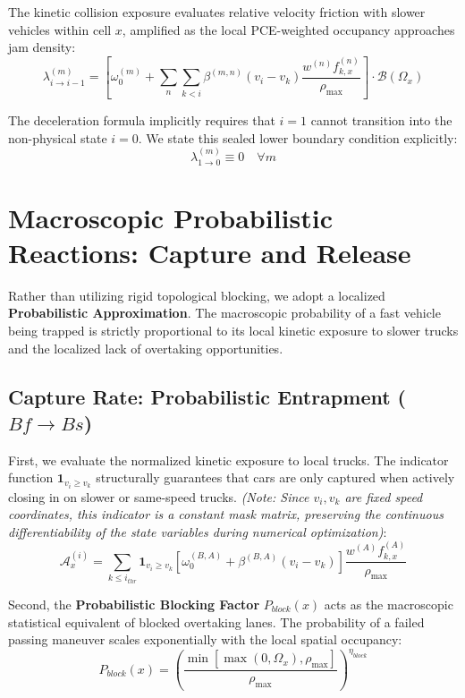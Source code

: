 \documentclass[11pt,a4paper]{article}
\begin{document}
The kinetic collision exposure evaluates relative velocity friction with slower vehicles within cell $x$, amplified as the local PCE-weighted occupancy approaches jam density:
\begin{equation}
\lambda_{i\rightarrow i-1}^{(m)} = \left[ \omega_{0}^{(m)} + \sum_{n}\sum_{k<i}\beta^{(m,n)}(v_{i}-v_{k}) \frac{w^{(n)} f_{k,x}^{(n)}}{\rho_{\max}} \right] \cdot \mathcal{B}(\Omega_{x})
\end{equation}

The deceleration formula implicitly requires that $i=1$ cannot transition into the non-physical state $i=0$. We state this sealed lower boundary condition explicitly:
\begin{equation}
\lambda_{1\rightarrow 0}^{(m)} \equiv 0 \quad \forall m
\end{equation}

\section{Macroscopic Probabilistic Reactions: Capture and Release}
Rather than utilizing rigid topological blocking, we adopt a localized \textbf{Probabilistic Approximation}. The macroscopic probability of a fast vehicle being trapped is strictly proportional to its local kinetic exposure to slower trucks and the localized lack of overtaking opportunities.

\subsection{Capture Rate: Probabilistic Entrapment ($Bf \rightarrow Bs$)}
First, we evaluate the normalized kinetic exposure to local trucks. The indicator function $\mathbf{1}_{v_i \ge v_k}$ structurally guarantees that cars are only captured when actively closing in on slower or same-speed trucks. \textit{(Note: Since $v_i, v_k$ are fixed speed coordinates, this indicator is a constant mask matrix, preserving the continuous differentiability of the state variables during numerical optimization)}:
\begin{equation}
\mathcal{A}_{x}^{(i)} = \sum_{k \le i_{thr}} \mathbf{1}_{v_i \ge v_k} \left[ \omega_0^{(B,A)} + \beta^{(B,A)}(v_i - v_k) \right] \frac{w^{(A)} f_{k,x}^{(A)}}{\rho_{\max}}
\end{equation}

Second, the \textbf{Probabilistic Blocking Factor} $P_{block}(x)$ acts as the macroscopic statistical equivalent of blocked overtaking lanes. The probability of a failed passing maneuver scales exponentially with the local spatial occupancy:
\begin{equation}
P_{block}(x) = \left( \frac{\min[\max(0, \Omega_{x}), \rho_{\max}]}{\rho_{\max}} \right)^{\eta_{block}}
\end{equation}
\end{document}
